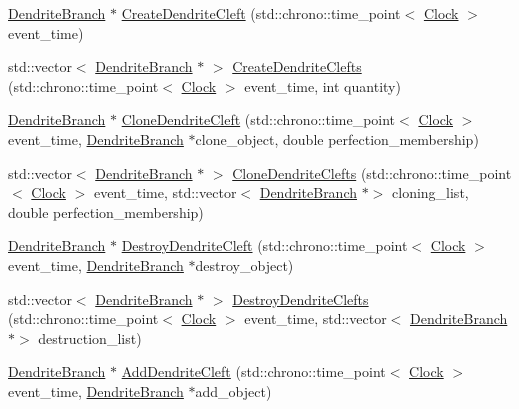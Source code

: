 \begin{DoxyCompactItemize}
\item 
\hyperlink{class_dendrite_branch}{Dendrite\+Branch} $\ast$ \hyperlink{class_dendrite_branch_a4f751442a537f2e3d7d0dc66a09bd84b}{Create\+Dendrite\+Cleft} (std\+::chrono\+::time\+\_\+point$<$ \hyperlink{universe_8h_a0ef8d951d1ca5ab3cfaf7ab4c7a6fd80}{Clock} $>$ event\+\_\+time)
\item 
std\+::vector$<$ \hyperlink{class_dendrite_branch}{Dendrite\+Branch} $\ast$ $>$ \hyperlink{class_dendrite_branch_a86d00d6ad66c8c83683e9e22d73a71b6}{Create\+Dendrite\+Clefts} (std\+::chrono\+::time\+\_\+point$<$ \hyperlink{universe_8h_a0ef8d951d1ca5ab3cfaf7ab4c7a6fd80}{Clock} $>$ event\+\_\+time, int quantity)
\item 
\hyperlink{class_dendrite_branch}{Dendrite\+Branch} $\ast$ \hyperlink{class_dendrite_branch_a45d2fea350165fe0c81f1f429aa96061}{Clone\+Dendrite\+Cleft} (std\+::chrono\+::time\+\_\+point$<$ \hyperlink{universe_8h_a0ef8d951d1ca5ab3cfaf7ab4c7a6fd80}{Clock} $>$ event\+\_\+time, \hyperlink{class_dendrite_branch}{Dendrite\+Branch} $\ast$clone\+\_\+object, double perfection\+\_\+membership)
\item 
std\+::vector$<$ \hyperlink{class_dendrite_branch}{Dendrite\+Branch} $\ast$ $>$ \hyperlink{class_dendrite_branch_a3cf1e07fe5e0ea827965c0dc76881c9f}{Clone\+Dendrite\+Clefts} (std\+::chrono\+::time\+\_\+point$<$ \hyperlink{universe_8h_a0ef8d951d1ca5ab3cfaf7ab4c7a6fd80}{Clock} $>$ event\+\_\+time, std\+::vector$<$ \hyperlink{class_dendrite_branch}{Dendrite\+Branch} $\ast$$>$ cloning\+\_\+list, double perfection\+\_\+membership)
\item 
\hyperlink{class_dendrite_branch}{Dendrite\+Branch} $\ast$ \hyperlink{class_dendrite_branch_a60225ab106eae6bce25eb8159166d5e9}{Destroy\+Dendrite\+Cleft} (std\+::chrono\+::time\+\_\+point$<$ \hyperlink{universe_8h_a0ef8d951d1ca5ab3cfaf7ab4c7a6fd80}{Clock} $>$ event\+\_\+time, \hyperlink{class_dendrite_branch}{Dendrite\+Branch} $\ast$destroy\+\_\+object)
\item 
std\+::vector$<$ \hyperlink{class_dendrite_branch}{Dendrite\+Branch} $\ast$ $>$ \hyperlink{class_dendrite_branch_a454dd0483439353076df63fc124a24f7}{Destroy\+Dendrite\+Clefts} (std\+::chrono\+::time\+\_\+point$<$ \hyperlink{universe_8h_a0ef8d951d1ca5ab3cfaf7ab4c7a6fd80}{Clock} $>$ event\+\_\+time, std\+::vector$<$ \hyperlink{class_dendrite_branch}{Dendrite\+Branch} $\ast$$>$ destruction\+\_\+list)
\item 
\hyperlink{class_dendrite_branch}{Dendrite\+Branch} $\ast$ \hyperlink{class_dendrite_branch_a060f0c55b2e6cb65b68e160df0bbf563}{Add\+Dendrite\+Cleft} (std\+::chrono\+::time\+\_\+point$<$ \hyperlink{universe_8h_a0ef8d951d1ca5ab3cfaf7ab4c7a6fd80}{Clock} $>$ event\+\_\+time, \hyperlink{class_dendrite_branch}{Dendrite\+Branch} $\ast$add\+\_\+object)

\end{DoxyCompactItemize}
